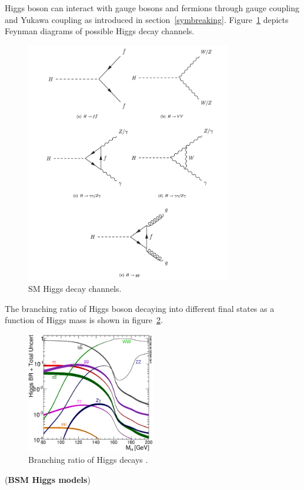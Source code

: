 Higgs boson can interact with gauge bosons and fermions through gauge coupling and Yukawa coupling as introduced in section~\ref{symbreaking}.
Figure~\ref{fig:higgs_decay_fd} depicts Feynman diagrams of possible Higgs decay channels.
\begin{figure}[!htb]
  \centering
  \includegraphics[width=0.8\textwidth]{figures/Theory/Figures_Feynman_Hdecay.png}
  \caption{SM Higgs decay channels.}
  \label{fig:higgs_decay_fd}
\end{figure}
The branching ratio of Higgs boson decaying into different final states as a function of Higgs mass is shown in figure~\ref{fig:higgs_decay_br}.
\begin{figure}[!htb]
  \centering
  \includegraphics[width=0.5\textwidth]{figures/Theory/Higgs_BR_LM.eps}
  \caption{Branching ratio of Higgs decays \cite{Heinemeyer:1559921}. }
  \label{fig:higgs_decay_br}
\end{figure} 

(\textbf{BSM Higgs models})


